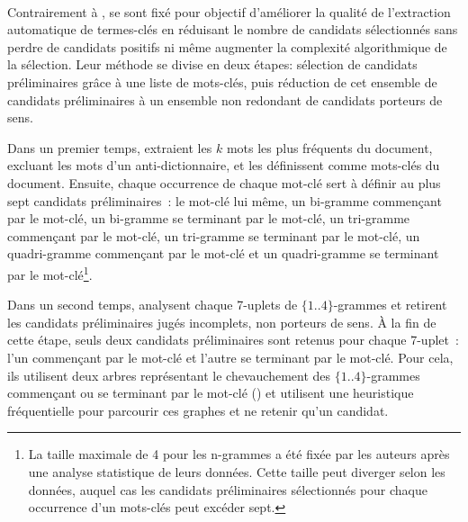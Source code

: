     ~\\Contrairement à ,
     se sont fixé pour objectif d'améliorer
    la qualité de l'extraction automatique de termes-clés en réduisant le nombre
    de candidats sélectionnés sans perdre de candidats positifs ni même
    augmenter la complexité algorithmique de la sélection. Leur méthode se
    divise en deux étapes: sélection de candidats préliminaires grâce à une
    liste de mots-clés, puis réduction de cet ensemble de candidats
    préliminaires à un ensemble non redondant de candidats porteurs de sens.

    Dans un premier temps,  extraient les
    $k$ mots les plus fréquents du document, excluant les mots d'un
    anti-dictionnaire, et les définissent comme mots-clés du document. Ensuite,
    chaque occurrence de chaque mot-clé sert à définir au plus sept candidats
    préliminaires~: le mot-clé lui même, un bi-gramme commençant par le mot-clé,
    un bi-gramme se terminant par le mot-clé, un tri-gramme commençant par le
    mot-clé, un tri-gramme se terminant par le mot-clé, un quadri-gramme
    commençant par le mot-clé et un quadri-gramme se terminant par le
    mot-clé\footnote{La taille maximale de 4 pour les n-grammes a été fixée par
    les auteurs après une analyse statistique de leurs données. Cette taille peut
    diverger selon les données, auquel cas les candidats préliminaires
    sélectionnés pour chaque occurrence d'un mots-clés peut excéder sept.}.

    \begin{example}
    \end{example}

    Dans un second temps,  analysent chaque
    7-uplets de $\{1..4\}$-grammes et retirent les candidats préliminaires jugés
    incomplets, non porteurs de sens. À la fin de cette étape, seuls deux
    candidats préliminaires sont retenus pour chaque 7-uplet~: l'un commençant par le
    mot-clé et l'autre se terminant par le mot-clé. Pour cela, ils utilisent
    deux arbres représentant le chevauchement des $\{1..4\}$-grammes commençant
    ou se terminant par le mot-clé () et utilisent une heuristique
    fréquentielle pour parcourir ces graphes et ne retenir qu'un candidat.


